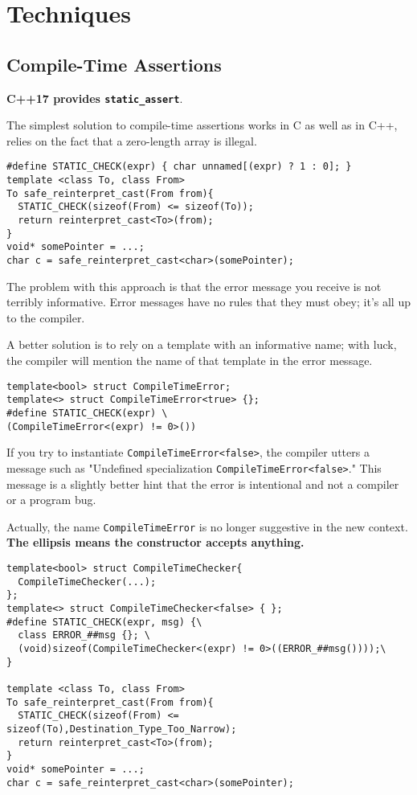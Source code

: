 \newpage
\section{Techniques}

\subsection{Compile-Time Assertions}

\textbf{C++17 provides \texttt{static\_assert}}.

The simplest solution to compile-time assertions works in C as well as in
C++, relies on the fact that a zero-length array is illegal.

\begin{verbatim}
#define STATIC_CHECK(expr) { char unnamed[(expr) ? 1 : 0]; }
template <class To, class From>
To safe_reinterpret_cast(From from){
  STATIC_CHECK(sizeof(From) <= sizeof(To));
  return reinterpret_cast<To>(from);
}
void* somePointer = ...;
char c = safe_reinterpret_cast<char>(somePointer);
\end{verbatim}

The problem with this approach is that the error message you receive
is not terribly informative. Error messages have no rules that they
must obey; it's all up to the compiler.

A better solution is to rely on a template with an informative name;
with luck, the compiler will mention the name of that template in the
error message.

\begin{verbatim}
template<bool> struct CompileTimeError;
template<> struct CompileTimeError<true> {};
#define STATIC_CHECK(expr) \
(CompileTimeError<(expr) != 0>())
\end{verbatim}

If you try to instantiate
\texttt{CompileTimeError<false>}, the compiler utters a message such
as "Undefined specialization \texttt{CompileTimeError<false>}." This
message is a slightly better hint that the error is intentional and
not a compiler or a program bug.

Actually, the name \texttt{CompileTimeError} is no longer suggestive
in the new context. \textbf{The ellipsis means the constructor accepts anything.}

\begin{verbatim}
template<bool> struct CompileTimeChecker{
  CompileTimeChecker(...);
};
template<> struct CompileTimeChecker<false> { };
#define STATIC_CHECK(expr, msg) {\
  class ERROR_##msg {}; \
  (void)sizeof(CompileTimeChecker<(expr) != 0>((ERROR_##msg())));\
}

template <class To, class From>
To safe_reinterpret_cast(From from){
  STATIC_CHECK(sizeof(From) <= sizeof(To),Destination_Type_Too_Narrow);
  return reinterpret_cast<To>(from);
}
void* somePointer = ...;
char c = safe_reinterpret_cast<char>(somePointer);
\end{verbatim}

